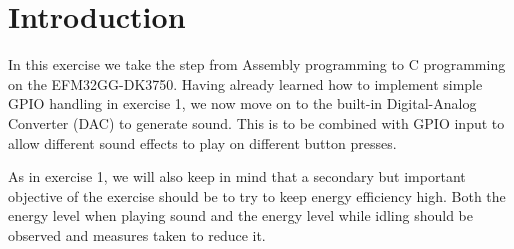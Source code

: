 \chapter{Introduction}

In this exercise we take the step from Assembly programming to C programming on the EFM32GG-DK3750. Having already learned how to implement simple GPIO handling in exercise 1, we now move on to the built-in Digital-Analog Converter (DAC) to generate sound. This is to be combined with GPIO input to allow different sound effects to play on different button presses.

As in exercise 1, we will also keep in mind that a secondary but important objective of the exercise should be to try to keep energy efficiency high. Both the energy level when playing sound and the energy level while idling should be observed and measures taken to reduce it.
